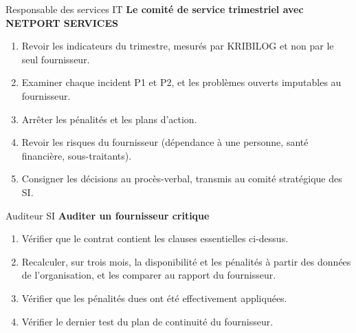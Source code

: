 \begin{boxmetier}{Responsable des services IT}
\textbf{Le comité de service trimestriel avec NETPORT SERVICES}
\begin{enumerate}
    \item Revoir les indicateurs du trimestre, mesurés par KRIBILOG et non
          par le seul fournisseur.
    \item Examiner chaque incident P1 et P2, et les problèmes ouverts
          imputables au fournisseur.
    \item Arrêter les pénalités et les plans d'action.
    \item Revoir les risques du fournisseur (dépendance à une personne,
          santé financière, sous-traitants).
    \item Consigner les décisions au procès-verbal, transmis au comité
          stratégique des SI.
\end{enumerate}
\end{boxmetier}

\begin{boxmetier}{Auditeur SI}
\textbf{Auditer un fournisseur critique}
\begin{enumerate}
    \item Vérifier que le contrat contient les clauses essentielles
          ci-dessus.
    \item Recalculer, sur trois mois, la disponibilité et les pénalités à
          partir des données de l'organisation, et les comparer au rapport
          du fournisseur.
    \item Vérifier que les pénalités dues ont été effectivement appliquées.
    \item Vérifier le dernier test du plan de continuité du fournisseur.
\end{enumerate}
\end{boxmetier}

\separateur

